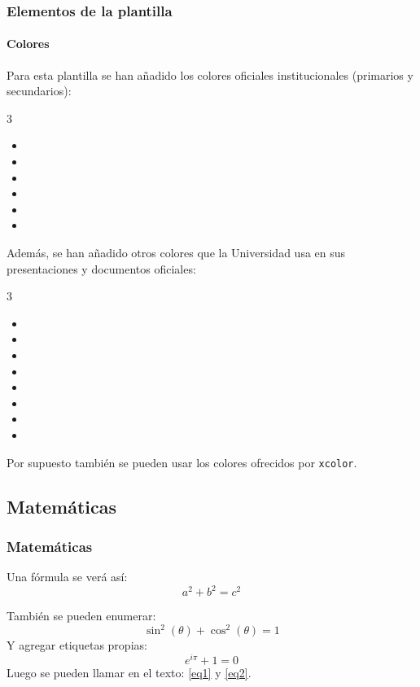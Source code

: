 \documentclass[aspectratio=169,usenames,dvipsnames,spanish]{beamer}
\begin{document}
\begin{frame}
\frametitle{Elementos de la plantilla}
\framesubtitle{Colores}
    Para esta plantilla se han añadido los colores oficiales institucionales (primarios y secundarios):
    \begin{multicols}{3}
    \begin{itemize}
        \item {}
        \item {}
        \item {}
        \item {}
        \item {}
        \item {}
    \end{itemize}
    \end{multicols}
    Además, se han añadido otros colores que la Universidad usa en sus presentaciones y documentos oficiales:
    \begin{multicols}{3}
        \begin{itemize}
            \item {}
            \item {}
            \item {}
            \item {}
            \item {}
            \item {}
            \item {}
            \item {}
        \end{itemize}
    \end{multicols}
    Por supuesto también se pueden usar los colores ofrecidos por \texttt{xcolor}.
\end{frame}

\subsection{Matemáticas}
\begin{frame}
\frametitle{Matemáticas}

Una fórmula se verá así:
\[a^2 + b^2 = c^2\]

También se pueden enumerar:
\begin{equation}\label{eq1}
\sin^2(\theta)+\cos^2(\theta)=1
\end{equation}
Y agregar etiquetas propias:
\begin{equation}\label{eq2}
e^{i\pi}+1=0 \tag{$\Coffeecup$}
\end{equation}
Luego se pueden llamar en el texto: \eqref{eq1} y \eqref{eq2}.
\end{frame}
\end{document}
